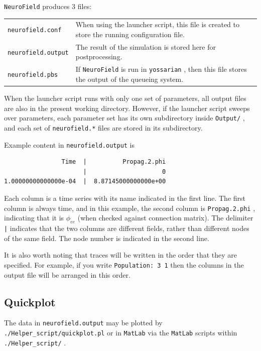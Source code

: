 \documentclass[12pt,a4paper]{article}
\newcommand{\type}[1]{ {\small\small\tt #1} }
\newcommand{\NF}[0]{ \type{NeuroField}}
\begin{document}
\NF produces 3 files:

\begin{tabular}{l p{14.4cm}}
\type{neurofield.conf}& When using the launcher script, this file is created to store the running configuration file.\\
\type{neurofield.output}& The result of the simulation is stored here for postprocessing.\\
\type{neurofield.pbs}& If \NF is run in \type{yossarian}, then this file stores the output of the queueing system.
\end{tabular}

When the launcher script runs with only one set of parameters, all output files are also in the present working directory. However, if the launcher script sweeps over parameters, each parameter set has its own subdirectory inside \type{Output/}, and each set of \type{neurofield.*} files are stored in its subdirectory.

Example content in \type{neurofield.output} is
\begin{lstlisting}
                Time  |          Propag.2.phi
                      |                     0
1.00000000000000e-04  |  8.87145000000000e+00
\end{lstlisting}

Each column is a time series with its name indicated in the first line. The first column is always time, and in this example, the second column is \type{Propag.2.phi}, indicating that it is $\phi_{ee}$ (when checked against connection matrix). The delimiter \type{|} indicates that the two columns are different fields, rather than different nodes of the same field. The node number is indicated in the second line.

It is also worth noting that traces will be written in the order that they are specified. For example, if you write \type{Population: 3 1} then the columns in the output file will be arranged in this order. 

\subsection{Quickplot}

The data in \type{neurofield.output} may be plotted by \type{./Helper\_script/quickplot.pl} or in \type{MatLab} via the \type{MatLab} scripts within \type{./Helper\_script/}.
\end{document}
